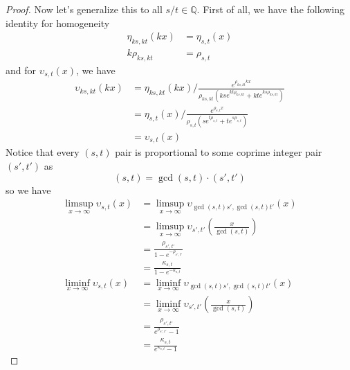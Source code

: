 \documentclass[]{article}
\begin{document}
\begin{proof}
	Now let's generalize this to all $s/t\in\mathbb{Q}$. First of all, we have the following identity for homogeneity 
	\begin{align*}
	\eta_{ks,kt}(kx) &= \eta_{s, t}(x) \\
	k\rho_{ks,kt} &= \rho_{s,t}
	\end{align*}
	and for $\upsilon_{s,t}(x)$, we have
	\begin{align*}
	\upsilon_{ks,kt}(kx) &= \eta_{ks,kt}(kx) \big/ \frac{e^{\rho_{ks,kt} kx}}{\rho_{ks,kt}(ks e^{kt\rho_{ks,kt}} + kte^{ks\rho_{ks,kt}})} \\
		&= \eta_{s,t}(x) \big/ \frac{e^{\rho_{s,t} x}}{\rho_{s,t}(s e^{t\rho_{s,t}} + te^{s\rho_{s,t}})}\\
		&= \upsilon_{s,t}(x)
	\end{align*}
    Notice that every $(s,t)$ pair is proportional to some coprime integer pair $(s', t')$ as 
	\[
	 (s,t) = \gcd(s,t)\cdot(s',t')
	\]
	so we have
	\begin{align*}
	\limsup_{x\to\infty} \upsilon_{s,t}(x) &= \limsup_{x\to\infty} \upsilon_{\gcd(s,t)s',\gcd(s,t)t'}(x) \\
	&= \limsup_{x\to\infty} \upsilon_{s',t'}\left(\frac{x}{\gcd(s,t)}\right)\\
	&= \frac{\rho_{s',t'}}{1 - e^{-\rho_{s',t'}}}\\
	&= \frac{\kappa_{s,t}}{1 - e^{-\kappa_{s,t}}}\\
	\liminf_{x\to\infty} \upsilon_{s,t}(x) &= \liminf_{x\to\infty} \upsilon_{\gcd(s,t)s',\gcd(s,t)t'}(x) \\
	&= \liminf_{x\to\infty} \upsilon_{s',t'}\left(\frac{x}{\gcd(s,t)}\right)\\
	&= \frac{\rho_{s',t'}}{e^{\rho_{s',t'}} - 1}\\
	&= \frac{\kappa_{s,t}}{e^{\kappa_{s,t}} - 1}
	\end{align*}

\end{proof}
\end{document}
